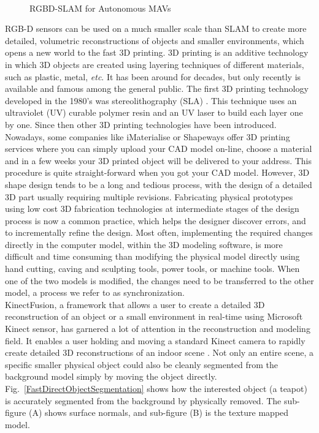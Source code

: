 %
\\\indent
%
\begin{figure}[t]
\centering
{}
\caption{RGBD-SLAM for Autonomous MAVs \cite{RGBDSLAMmav_2013}}
\label{autoRGBD_SLAM_MAV}
\end{figure}%
RGB-D sensors can be used on a much smaller scale than SLAM to create more detailed, volumetric reconstructions of objects and smaller environments, which opens a new world to the fast 3D printing. 3D printing is an additive technology in which 3D objects are created using layering techniques of different materials, such as plastic, metal, \textit{etc}.  It has been around for decades, but only recently is available and famous among the general public. The first 3D printing technology developed in the 1980’s was stereolithography (SLA) \cite{Patent3Dprinting86}. This technique uses an ultraviolet (UV) curable polymer resin and an UV laser to build each layer one by one. Since then other 3D printing technologies have been introduced. Nowadays, some companies like iMaterialise or Shapeways offer 3D printing services where you can simply upload your CAD model on-line, choose a material and in a few weeks your 3D printed object will be delivered to your address. This procedure is quite straight-forward when you got your CAD model. However, 3D shape design tends to be a long and tedious process, with the design of a detailed 3D part usually requiring multiple revisions. Fabricating physical prototypes using low cost 3D fabrication technologies at intermediate stages of the design process is now a common practice, which helps the designer discover errors, and to incrementally reﬁne the design. Most often, implementing the required changes directly in the computer model, within the 3D modeling software, is more difficult and time consuming than modifying the physical model directly using hand cutting, caving and sculpting tools, power tools, or machine tools. When one of the two models is modified, the changes need to be transferred to the other model, a process we refer to as synchronization. 
\\\indent
KinectFusion, a framework that allows a user to create a detailed 3D reconstruction of an object or a small environment in real-time using Microsoft Kinect sensor, has garnered a lot of attention in the reconstruction and modeling field. It enables a user holding and moving a standard Kinect camera to rapidly create detailed 3D reconstructions of an indoor scene \cite{KinectFusionIzadi_2011}. Not only an entire scene, a specific smaller physical object could also be cleanly segmented from the background model simply by moving the object directly. Fig.~\ref{FastDirectObjectSegmentation} shows how the interested object (a teapot) is accurately segmented from the background by physically removed. The sub-figure (A) shows surface normals, and sub-figure (B) is the texture mapped model. %
